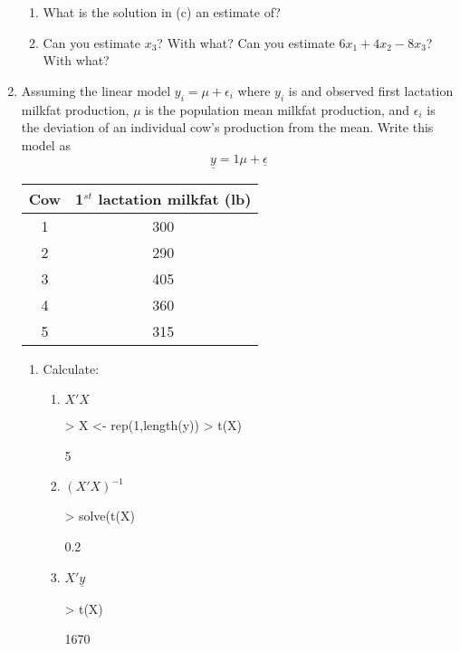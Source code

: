 \documentclass[12pt,a4paper]{paper}
\begin{document}
\begin{enumerate}
\begin{enumerate}
\item What is the solution in (c) an estimate of?
\item Can you estimate $x_{3}$? With what? Can you estimate $6x_{1} + 4x_{2} - 8x_{3}$? With what?
\end{enumerate}
\item Assuming the linear model $y_{i} = \mu + \epsilon_{i}$ where $y_{i}$ is and observed first lactation milkfat production, $\mu$ is the population mean milkfat production, and $\epsilon_{i}$ is the deviation of an individual cow's production from the mean. Write this model as \[\underline{y} = 1\mu + \underline{\epsilon}\]
\begin{center}
\begin{tabular}{|c|c|}
\hline
Cow & 1$^{st}$ lactation milkfat (lb)\\
\hline\hline
1&300\\
\hline
2&290\\
\hline
3&405\\
\hline
4&360\\
\hline
5&315\\
\hline
\end{tabular}
\end{center}
\begin{enumerate}
\item Calculate:
\begin{enumerate}
\item $X'X$
\begin{Schunk}
\begin{Sinput}
> X <- rep(1,length(y))
> t(X) %*% X
\end{Sinput}
\begin{Soutput}
     [,1]
[1,]    5
\end{Soutput}
\end{Schunk}
\item $(X'X)^{-1}$
\begin{Schunk}
\begin{Sinput}
> solve(t(X) %*% X)
\end{Sinput}
\begin{Soutput}
     [,1]
[1,]  0.2
\end{Soutput}
\end{Schunk}
\item $X'\underline{y}$
\begin{Schunk}
\begin{Sinput}
> t(X) %*% y
\end{Sinput}
\begin{Soutput}
     [,1]
[1,] 1670

\end{Soutput}
\end{Schunk}
\end{enumerate}
\end{enumerate}
\end{enumerate}
\end{document}
